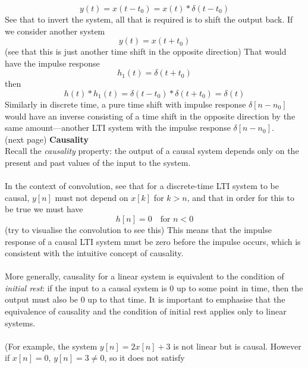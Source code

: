 \documentclass{report}
\begin{document}
\begin{equation*}
y(t)=x(t-t_0)=x(t)*\delta(t-t_0)
\end{equation*}
See that to invert the system, all that is required is to shift the output back. If we consider another system
\begin{equation*}
y(t)=x(t+t_0)
\end{equation*}
(see that this is just another time shift in the opposite direction) That would have the impulse response
\begin{equation*}
h_1(t)=\delta(t+t_0)
\end{equation*}
then 
\begin{equation*}
h(t)*h_1(t)=\delta(t-t_0)*\delta(t+t_0)=\delta(t)
\end{equation*}
Similarly in discrete time, a pure time shift with impulse response
$\delta[n-n_0]$ would have an inverse consisting of a time shift in the opposite direction by the same amount---another LTI system with
the impulse response $\delta[n-n_0]$.\\
(next page)\newpage
\noindent\textbf{Causality}\\
Recall the \textit{causality} property: the output of a causal system depends only on the present and past values of the input to the
system.\\
\vspace{1mm}\\
In the context of convolution, see that for a discrete-time LTI system to be causal, $y[n]$ must not depend on $x[k]$ for $k>n$, and that
in order for this to be true we must have
\begin{equation*}
h[n]=0\quad\text{for }n<0
\end{equation*}
(try to visualise the convolution to see this) This means that the impulse response of a causal LTI system must be zero before
the impulse occurs, which is consistent with the intuitive concept of causality.\\
\vspace{1mm}\\
More generally, causality for a linear system is equivalent to the condition of \textit{initial rest}: if the input to a causal system is 
0 up to some point in time, then the output must also be 0 up to that time. It is important to emphasise that the equivalence of causality
and the condition of initial rest applies only to linear systems.\\
\vspace{1mm}\\
(For example, the system $y[n]=2x[n]+3$ is not linear but is causal. However if $x[n]=0$, $y[n]=3\neq0$, so it does not satisfy
\end{document}

